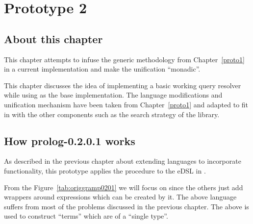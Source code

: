 \documentclass[thesis-solanki.tex]{subfiles}
\begin{document}
\chapter{Prototype 2}{\label{proto2.1}}

\section{About this chapter}
This chapter attempts to infuse the generic methodology from Chapter~\ref{proto1} in a current 
implementation \cite{prolog-lib} and make the unification ``monadic''.

This chapter discusses the idea of implementing a basic working  query resolver while using
\cite{prolog-lib} as the base implementation.
The language modifications and unification mechanism have been taken from Chapter~\ref{proto1} and adapted to fit
in with the other components such as the search strategy of the library.


\section{How prolog-0.2.0.1 works}

As described in the previous chapter about extending languages to incorporate functionality, this prototype applies
the procedure to the eDSL in \cite{prolog-lib}.

From the Figure~\ref{tab:origgramp0201} we will focus on   since the others just
add wrappers around expressions which can be created by it.
The above language suffers from most of the problems discussed in the previous chapter.
The above is used to construct  ``terms'' which are of a ``single type''.
\end{document}
